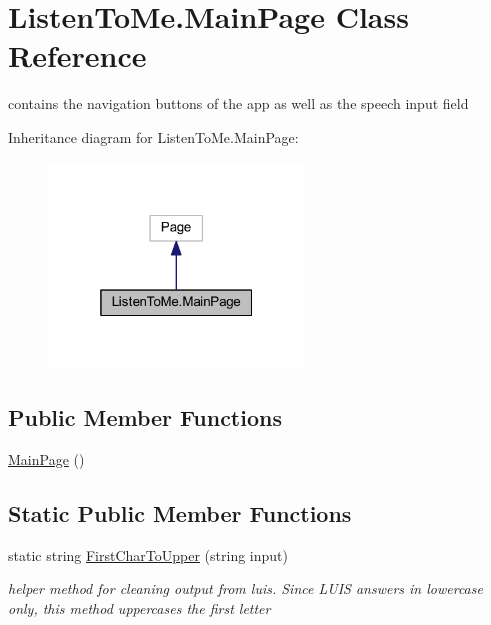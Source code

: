 \hypertarget{class_listen_to_me_1_1_main_page}{}\section{Listen\+To\+Me.\+Main\+Page Class Reference}
\label{class_listen_to_me_1_1_main_page}


contains the navigation buttons of the app as well as the speech input field  




Inheritance diagram for Listen\+To\+Me.\+Main\+Page\+:\nopagebreak
\begin{figure}[H]
\begin{center}
\leavevmode
\includegraphics[width=193pt]{class_listen_to_me_1_1_main_page__inherit__graph}
\end{center}
\end{figure}
\subsection*{Public Member Functions}
\begin{DoxyCompactItemize}
\item 
\mbox{\hyperlink{class_listen_to_me_1_1_main_page_afb2ff548c6284f6f179fc9b3dcc89245}{Main\+Page}} ()
\end{DoxyCompactItemize}
\subsection*{Static Public Member Functions}
\begin{DoxyCompactItemize}
\item 
static string \mbox{\hyperlink{class_listen_to_me_1_1_main_page_af4469348ffee9a5d1a8680d2535a279b}{First\+Char\+To\+Upper}} (string input)
\begin{DoxyCompactList}\small\item\em helper method for cleaning output from luis. Since L\+U\+IS answers in lowercase only, this method uppercases the first letter \end{DoxyCompactList}\end{DoxyCompactItemize}
